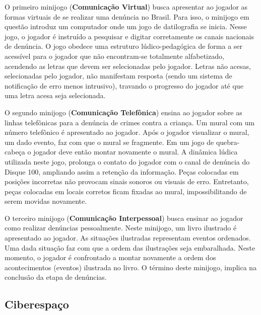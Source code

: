 \begin{figure}
  \vspace{-1.0cm}
\end{figure}


O primeiro minijogo (\textbf{Comunicação Virtual}) busca apresentar ao jogador as formas virtuais de se realizar uma denúncia no Brasil. Para isso, o minijogo em questão introduz um computador onde um jogo de datilografia se inicia. Nesse jogo, o jogador é instruído a pesquisar e digitar corretamente os canais nacionais de denúncia. O jogo obedece uma estruturo lúdico-pedagógica de forma a ser acessível para o jogador que não encontram-se totalmente alfabetizado, acendendo as letras que devem ser selecionadas pelo jogador. Letras não acesas, selecionadas pelo jogador, não manifestam resposta (sendo um sistema de notificação de erro menos intrusivo), travando o progresso do jogador até que uma letra acesa seja selecionada. 

O segundo minijogo (\textbf{Comunicação Telefônica}) ensina ao jogador sobre as linhas telefônicas para a denúncia de crimes contra a criança. Um mural com um número telefônico é apresentado ao jogador. Após o jogador visualizar o mural, um dado evento, faz com que o mural se fragmente. Em um jogo de quebra-cabeça o jogador deve então montar novamente o mural. A dinâmica lúdica utilizada neste jogo, prolonga o contato do jogador com o canal de denúncia do Disque 100, ampliando assim a retenção da informação. Peças colocadas em posições incorretas não provocam sinais sonoros ou visuais de erro. Entretanto, peças colocadas em locais corretos ficam fixadas ao mural, impossibilitando de serem movidas novamente. 

O terceiro minijogo (\textbf{Comunicação Interpessoal}) busca ensinar ao jogador como realizar denúncias pessoalmente. Neste minijogo, um livro ilustrado é apresentado ao jogador. As situações ilustradas representam eventos ordenados. Uma dada situação faz com que a ordem das ilustrações seja embaralhada. Neste momento, o jogador é confrontado a montar novamente a ordem dos acontecimentos (eventos) ilustrada no livro. 
O término deste minijogo, implica na conclusão da etapa de denúncias. 


\subsection{Ciberespaço}\label{subsec:4}

